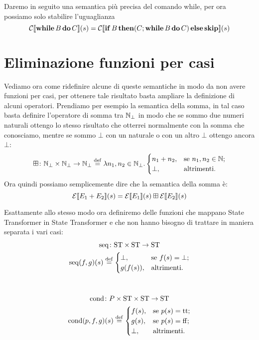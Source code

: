 Daremo in seguito una semantica più precisa del comando while, per ora possiamo solo stabilire l'uguaglianza
$$\mathcal{C} \llbracket \mathop{\textup{\textbf{while}}} B \mathop{\textup{\textbf{do}}} C \rrbracket (s) = \mathcal{C} \llbracket \mathop{\textup{\textbf{if}}} B \mathop{\textup{\textbf{then}}} (C ; \mathop{\textup{\textbf{while}}} B \mathop{\textup{\textbf{do}}} C) \mathop{\textup{\textbf{else}}} \mathop{\textup{\textbf{skip}}} \rrbracket (s)$$

\section{Eliminazione funzioni per casi}
\label{sec:definizione di F}
Vediamo ora come ridefinire alcune di queste semantiche in modo da non avere funzioni per casi, per ottenere tale risultato basta ampliare la definizione di alcuni operatori. Prendiamo per esempio la semantica della somma, in tal caso basta definire l'operatore di somma tra $\mathbb{N}_\bot$ in modo che se sommo due numeri naturali ottengo lo stesso risultato che otterrei normalmente con la somma che conosciamo, mentre se sommo $\bot$ con un naturale o con un altro $\bot$ ottengo ancora $\bot$:
$$\fund{\conadd}{\Nset_\bot \times \Nset_\bot}{\Nset_\bot} \defeq \lambda n_1, n_2 \in \Nset_\bot . \begin{cases}
        n_1 + n_2, &\text{se $n_1, n_2 \in \Nset$;}\\
        \bot, &\text{altrimenti.}
        \end{cases}$$
Ora quindi possiamo semplicemente dire che la semantica della somma è:
$$\mathcal{E} \llbracket E_1 + E_2 \rrbracket (s) = \mathcal{E} \llbracket E_1 \rrbracket (s) \mathbin{\boxplus} \mathcal{E} \llbracket E_2 \rrbracket (s)$$

Esattamente allo stesso modo ora definiremo delle funzioni che mappano State Transformer in State Transformer e che non hanno bisogno di trattare in maniera separata i vari casi:
\begin{gather*}
\fund{\seq}{\ST \times \ST}{\ST} \\
\seq(f,g)(s) \defeq \begin{cases}
        \bot, &\text{se $f(s) = \bot$;}\\
        g(f(s)), &\text{altrimenti.}
        \end{cases}\\
\pts
\fund{\cond}{P \times \ST \times \ST}{\ST} \\
  \cond(p,f,g)(s) \defeq \begin{cases}
        f(s), &\text{se $p(s) = \ttv$;}\\
        g(s), &\text{se $p(s) = \ffv$;}\\
        \bot, &\text{altrimenti.}
        \end{cases}\\
\end{gather*}

